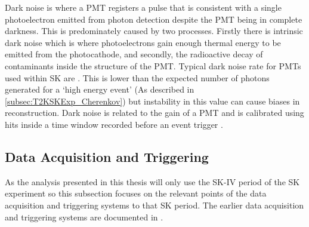 
Dark noise is where a PMT registers a pulse that is consistent with a single photoelectron emitted from photon detection despite the PMT being in complete darkness. This is predominately caused by two processes. Firstly there is intrinsic dark noise which is where photoelectrons gain enough thermal energy to be emitted from the photocathode, and secondly, the radioactive decay of contaminants inside the structure of the PMT. Typical dark noise rate for PMTs used within SK are  \cite{Fukuda2003-ly}. This is lower than the expected number of photons generated for a `high energy event' (As described in \autoref{subsec:T2KSKExp_Cherenkov}) but instability in this value can cause biases in reconstruction. Dark noise is related to the gain of a PMT and is calibrated using hits inside a time window recorded before an event trigger \cite{thesis_focht}.

\subsection{Data Acquisition and Triggering}
\label{subsec:T2KSKExp_SKTriggering}

As the analysis presented in this thesis will only use the SK-IV period of the SK experiment so this subsection focuses on the relevant points of the data acquisition and triggering systems to that SK period. The earlier data acquisition and triggering systems are documented in \cite{34489,PhysRevD.73.112001}. 

